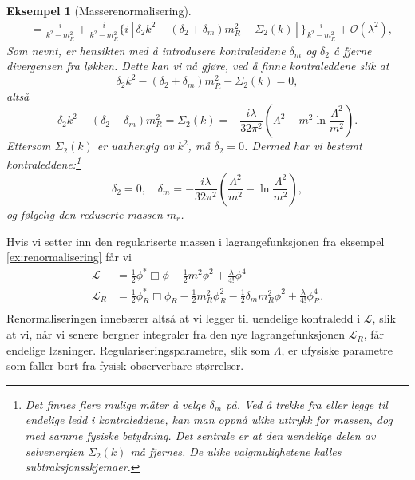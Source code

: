 \documentclass{article}
\newtheorem{example}{Eksempel}
\renewcommand{\L}{\mathcal{L}}
\renewcommand{\O}{\mathcal{O}}
\begin{document}
\begin{example}[Masserenormalisering]
\begin{equation*}
\begin{split}
        &= \frac{i}{k^2 - m_R^2}
        + \frac{i}{k^2 - m_R^2} \{
            i [\delta_2 k^2 - (\delta_2 + \delta_m) m_R^2 - \Sigma_2(k)]
        \} \frac{i}{k^2 - m_R^2} 
        + \O(\lambda^2),
        \end{split}
    \end{equation*}
    Som nevnt, er hensikten med å introdusere kontraleddene $\delta_m$ og $\delta_2$ å fjerne divergensen fra løkken.
    Dette kan vi nå gjøre, ved å finne kontraleddene slik at
    \begin{equation*}
            \delta_2 k^2 - (\delta_2 + \delta_m) m_R^2 - \Sigma_2(k) = 0,
    \end{equation*}
    altså
    \begin{equation*}
            \delta_2 k^2 - (\delta_2 + \delta_m) m_R^2 = \Sigma_2(k) 
            = - \frac{i\lambda}{32\pi^2} \left(\Lambda^2 - m^2 \ln{\frac{\Lambda^2}{m^2}}\right).
    \end{equation*}
    Ettersom $\Sigma_2(k)$ er uavhengig av $k^2$, må $\delta_2 = 0$.
    Dermed har vi bestemt kontraleddene:\footnote{Det finnes flere mulige måter å velge $\delta_m$ på. Ved å trekke fra eller legge til endelige ledd i kontraleddene, kan man oppnå ulike uttrykk for massen, dog med samme fysiske betydning. Det sentrale er at den uendelige delen av selvenergien $\Sigma_2(k)$ \emph{må} fjernes.
    De ulike valgmulighetene kalles subtraksjonsskjemaer.}
    \begin{equation*}
        \delta_2 = 0, \quad
        \delta_m 
            = - \frac{i\lambda}{32\pi^2} \left(\frac{\Lambda^2}{m^2} - \ln{\frac{\Lambda^2}{m^2}}\right),
    \end{equation*}
    og følgelig den reduserte massen $m_r$.
\end{example}

Hvis vi setter inn den regulariserte massen i lagrangefunksjonen fra eksempel \ref{ex:renormalisering} får vi
\begin{equation*}
    \begin{split}
    \L &= \frac{1}{2} \phi^* \Box \phi 
        - \frac{1}{2} m^2 \phi^2 
        + \frac{\lambda}{4!} \phi^4 \\
    \L_R &= \frac{1}{2} \phi_R^* \Box \phi_R 
        - \frac{1}{2} m_R^2 \phi_R^2 
        - \frac{1}{2} \delta_m m_R^2 \phi^2
        + \frac{\lambda}{4!} \phi_R^4. \\
    \end{split}
\end{equation*}
Renormaliseringen innebærer altså at vi legger til uendelige kontraledd i $\L$, slik at vi, når vi senere bergner integraler fra den nye lagrangefunksjonen $\L_R$, får endelige løsninger.
Regulariseringsparametre, slik som $\Lambda$, er ufysiske parametre som faller bort fra fysisk observerbare størrelser.
\end{document}
